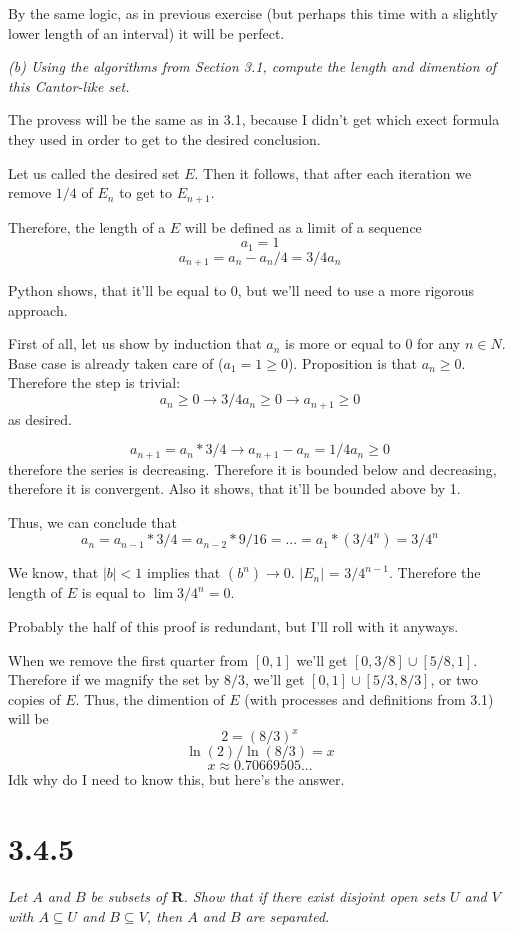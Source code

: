 \documentclass[11pt,oneside,titlepage]{book}
\begin{document}
By the same logic, as in previous exercise (but perhaps this time with a
slightly lower length of an interval) it will be perfect.

\textit{(b) Using the algorithms from Section 3.1, compute the length and
  dimention of this Cantor-like set.}

The provess will be the same as in 3.1, because I didn't get which
exect formula they used in order to get to the desired conclusion.

Let us called the desired set $E$. Then it follows, that after each iteration
we remove $1/4$ of $E_n$ to get to $E_{n + 1}$.


Therefore, the length of a $E$ will be defined as a limit of
a sequence
$$a_1 = 1$$
$$a_{n + 1} = a_n - a_n/4 = 3/4 a_n$$

Python shows, that it'll be equal to 0, but we'll need to use
a more rigorous approach.

First of all, let us show by induction that $a_n$ is more or equal to $0$
for any $n \in N$. Base case is already taken care of ($a_1  = 1\geq 0$).
Proposition is that $a_n \geq 0$. Therefore the step is trivial:
$$a_n \geq 0 \to 3/4 a_n \geq 0 \to a_{n + 1} \geq 0$$
as desired.

$$a_{n + 1} = a_n * 3/4 \to a_{n + 1} - a_n = 1/4 a_n \geq 0$$
therefore the series is decreasing. Therefore it is bounded below and
decreasing, therefore it is convergent. Also it shows, that it'll be bounded
above by 1.

Thus, we can conclude that
$$a_n = a_{n - 1} * 3/4 = a_{n - 2} * 9/16 = ... = a_1 * (3/4^n) = 3/4^n$$

We know, that $|b| < 1 $ implies that $ (b^n) \to 0$. $|E_n|$ =
$3/4^{n - 1}$. Therefore the length of $E$ is equal to $\lim 3/4^n = 0$.

Probably the half of this proof is redundant, but I'll roll with it anyways.

When we remove the first quarter from $[0, 1]$ we'll get
$[0, 3/8] \cup [5/8, 1]$. Therefore if we magnify the set by $8/3$, we'll get
$[0, 1] \cup [5/3, 8/3]$, or two copies of $E$. Thus, the dimention of $E$
(with processes and definitions from 3.1) will be
$$2 = (8/3)^x$$
$$\ln{(2)} / \ln{(8/3)} = x$$
$$x \approx 0.70669505...$$
Idk why do I need to know this, but here's the answer.

\section*{3.4.5}
\textit{Let $A$ and $B$ be subsets of $\textbf{R}$. Show that if there exist
  disjoint open sets $U$ and $V$ with $A \subseteq U$ and $B \subseteq V$,
  then $A$ and $B$ are separated.}
\end{document}
